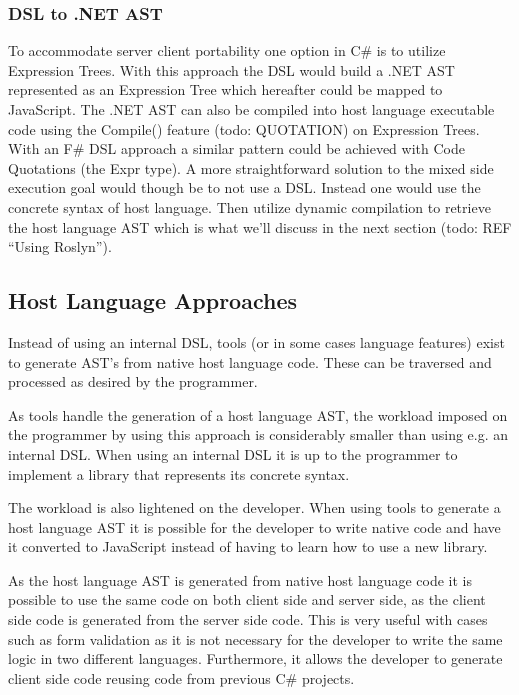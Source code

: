 		\subsubsection{DSL to .NET AST} %
		\label{sub:dsl_to_net_ast}
			To accommodate server client portability one option in C\# is to utilize Expression Trees. With this approach the DSL would build a .NET AST represented as an Expression Tree which hereafter could be mapped to JavaScript. The .NET AST can also be compiled into host language executable code using the Compile() feature (todo: QUOTATION) on Expression Trees. With an F\# DSL approach a similar pattern could be achieved with Code Quotations (the Expr type). A more straightforward solution to the mixed side execution goal would though be to not use a DSL. Instead one would use the concrete syntax of host language. Then utilize dynamic compilation to retrieve the host language AST which is what we'll discuss in the next section (todo: REF ``Using Roslyn'').


	\subsection{Host Language Approaches} %
	\label{sub:host_language_approaches}
		Instead of using an internal DSL, tools (or in some cases language features) exist to generate AST’s from native host language code. These can be traversed and processed as desired by the programmer.

		As tools handle the generation of a host language AST, the workload imposed on the programmer by using this approach is considerably smaller than using e.g. an internal DSL. When using an internal DSL it is up to the programmer to implement a library that represents its concrete syntax.

		The workload is also lightened on the developer. When using tools to generate a host language AST it is possible for the developer to write native code and have it converted to JavaScript instead of having to learn how to use a new library.

		As the host language AST is generated from native host language code it is possible to use the same code on both client side and server side, as the client side code is generated from the server side code. This is very useful with cases such as form validation as it is not necessary for the developer to write the same logic in two different languages. Furthermore, it allows the developer to generate client side code reusing code from previous C\# projects.

